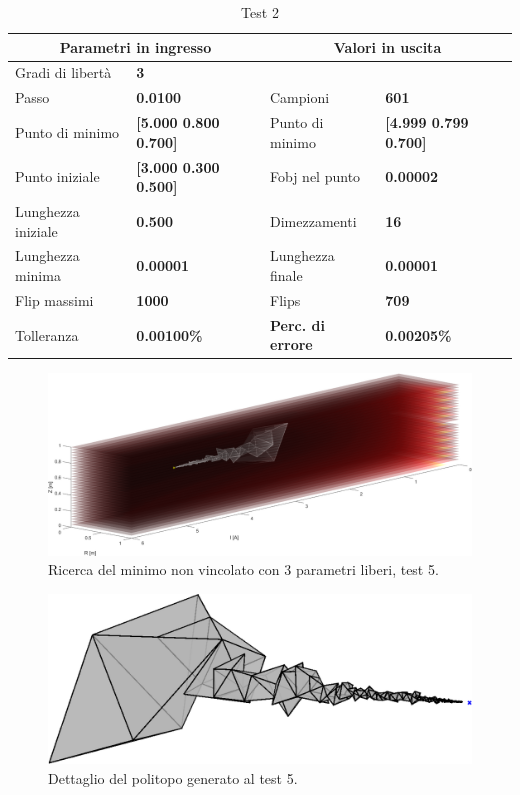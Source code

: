 \documentclass[a4paper, 11pt]{article}
\begin{document}
\begin{table}[h]
    \caption{Test 2}
    \begin{center}
    \begin{tabular}{|l|l|l|l|} 
    \hline 
\multicolumn{2}{|c|}{\textbf{Parametri in ingresso}} &
\multicolumn{2}{c|}{\textbf{Valori in uscita}} \\ \hline
Gradi di libertà  & \textbf{3} &  &  \\ \hline 
Passo & \textbf{0.0100} & Campioni & \textbf{601} \\ \hline 
Punto di minimo & \textbf{{[}5.000 0.800 0.700{]}} & Punto di minimo &
\textbf{{[}4.999 0.799 0.700{]}} \\ \hline 
Punto iniziale & \textbf{{[}3.000 0.300 0.500{]}} & Fobj nel punto &
\textbf{0.00002} \\ \hline 
Lunghezza iniziale & \textbf{0.500} & Dimezzamenti & \textbf{16} \\ \hline 
Lunghezza minima & \textbf{0.00001} & Lunghezza finale & \textbf{0.00001} \\
\hline
Flip massimi & \textbf{1000} & Flips & \textbf{709} \\ \hline 
Tolleranza & \textbf{0.00100\%} & \textbf{Perc. di errore} & \textbf{0.00205\%}
\\ \hline 
    \end{tabular}
    \end{center}
    \end{table}

\begin{figure}[H]
    \centering
        \includegraphics[width=16cm]{assets/figure4}
        \caption{Ricerca del minimo non vincolato con 3 parametri liberi, test 5.}
\end{figure}
\noindent 

\begin{figure}[H]
    \centering
        \includegraphics[width=14cm]{assets/figure5}
        \caption{Dettaglio del politopo generato al test 5.}
\end{figure}
\noindent 
\end{document}
